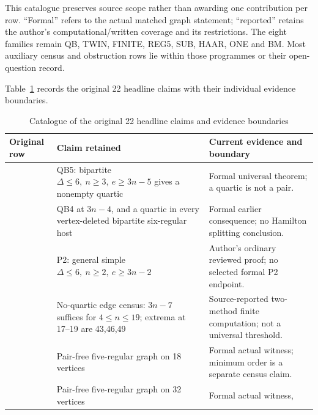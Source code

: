 \documentclass[smallextended]{svjour3}
\newcounter{none} %
\begin{document}
This catalogue preserves source scope rather than awarding one
contribution per row. ``Formal'' refers to the actual matched graph
statement; ``reported'' retains the author's computational/written
coverage and its restrictions. The eight families remain QB, TWIN,
FINITE, REG5, SUB, HAAR, ONE and BM. Most auxiliary census and
obstruction rows lie within those programmes or their open-question
record.

Table~\ref{tab:headline-catalogue} records the original 22 headline claims with their individual evidence boundaries.

{
\begin{longtable}[]{@{}
  >{\raggedleft\arraybackslash}p{}
  >{\raggedright\arraybackslash}p{}
  >{\raggedright\arraybackslash}p{}@{}}
\caption{Catalogue of the original 22 headline claims and evidence boundaries}\label{tab:headline-catalogue}\\
\toprule\noalign{}
\begin{minipage}[b]{\linewidth}\raggedleft
Original row
\end{minipage} & \begin{minipage}[b]{\linewidth}\raggedright
Claim retained
\end{minipage} & \begin{minipage}[b]{\linewidth}\raggedright
Current evidence and boundary
\end{minipage} \\
\midrule\noalign{}
\endhead
\bottomrule\noalign{}
\endlastfoot
1 & QB5: bipartite \(\Delta\le6,\ n\ge3,\ e\ge3n-5\) gives a nonempty
quartic & Formal universal theorem; a quartic is not a pair. \\
2 & QB4 at \(3n-4\), and a quartic in every vertex-deleted bipartite
six-regular host & Formal earlier consequence; no Hamilton splitting
conclusion. \\
3 & P2: general simple \(\Delta\le6,\ n\ge2,\ e\ge3n-2\) & Author's
ordinary reviewed proof; no selected formal P2 endpoint. \\
4 & No-quartic edge census: \(3n-7\) suffices for \(4\le n\le19\);
extrema at 17--19 are 43,46,49 & Source-reported two-method finite
computation; not a universal threshold. \\
5 & Pair-free five-regular graph on 18 vertices & Formal actual witness;
minimum order is a separate census claim. \\
6 & Pair-free five-regular graph on 32 vertices & Formal actual witness,

\end{longtable}}
\end{document}

